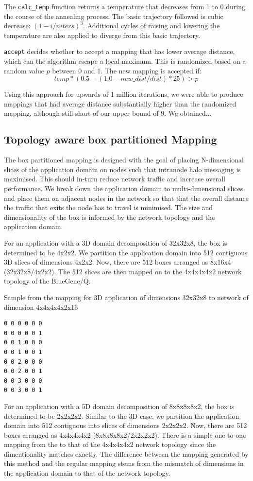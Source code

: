 \documentclass{acm_proc_article-sp}
\begin{document}
The \texttt{calc\_temp} function returns a temperature that
decreases from 1 to 0 during the course of the annealing process.
The basic trajectory followed is cubic decrease: $(1 - i/niters)^3$.
Additional cycles of raising and lowering the temperature are also
applied to diverge from this basic trajectory.

\texttt{accept} decides whether to accept a mapping that has lower
average distance, which can the algorithm escape a local maximum.
This is randomized based on a random value $p$ between 0 and 1.
The new mapping is accepted if:
$$temp * (0.5 - (1.0 - new\_dist/dist) * 25) > p$$

Using this approach for upwards of 1 million iterations,
we were able to produce mappings that had average distance substantially
higher than the randomized mapping, although still short of our upper
bound of $9$.  We obtained...  

\subsection{Topology aware box partitioned Mapping}

The box partitioned mapping is designed with the goal of placing N-dimensional slices of the application domain on nodes such that
intranode halo messaging is maximised. This should in-turn reduce network traffic and increase overall performance.
We break down the application domain to multi-dimensional slices and place them on adjacent nodes in the network so that that the
overall distance the traffic that exits the node has to travel is minimised. The size and dimensionality of the box is informed
by the network topology and the application domain.

For an application with a 3D domain decomposition of 32x32x8, the box is determined to be 4x2x2. We partition the application domain
into 512 contiguous 3D slices of dimensions 4x2x2. Now, there are 512 boxes arranged as 8x16x4 (32x32x8/4x2x2).
The 512 slices are then mapped on to the 4x4x4x4x2 network topology of the BlueGene/Q.

Sample from the mapping for 3D application of dimensions 32x32x8 to network of dimension 4x4x4x4x2x16
\begin{lstlisting}
0 0 0 0 0 0
0 0 0 0 0 1
0 0 1 0 0 0
0 0 1 0 0 1
0 0 2 0 0 0
0 0 2 0 0 1
0 0 3 0 0 0
0 0 3 0 0 1
\end{lstlisting}

For an application with a 5D domain decomposition of 8x8x8x8x2, the box is determined to be 2x2x2x2. Similar to the 3D case, we
partition the application domain into 512 contiguous into  slices of dimensions 2x2x2x2.
Now, there are 512 boxes arranged as 4x4x4x4x2 (8x8x8x8x2/2x2x2x2). There is a simple one to one mapping from the
to that of the 4x4x4x4x2 network topology since the dimentionality matches exactly. The difference between the mapping
generated by this method and the regular mapping stems from the mismatch of dimensions in the application domain to that
of the network topology.
\end{document}

